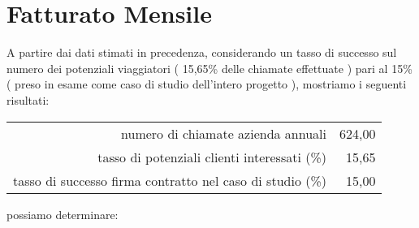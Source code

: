 \section[Fatturato Mensile]{Fatturato Mensile}
A partire dai dati stimati in precedenza, considerando un tasso di successo sul numero dei potenziali viaggiatori ( 15,65\% delle chiamate effettuate ) pari al 15\% ( preso in esame come caso di studio dell'intero progetto ), mostriamo i seguenti risultati:
\newline
\begin{center}
	\begin{tabular}{rr}
		numero di chiamate azienda annuali & 624\thinspace 040,00 \\
		tasso di potenziali clienti interessati (\%) & 15,65 \\
		tasso di successo firma contratto nel caso di studio (\%) & 15,00 \\	
	\end{tabular}
\end{center}
possiamo determinare:
